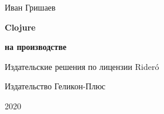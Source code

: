 
\begin{titlepage}

\begin{center}

  {Иван Гришаев}

  \vspace*{5cm}

  {\Huge\textbf{Clojure}}

  \vspace{1mm}

  {\Large\textbf{на производстве}}

  \vspace*{\fill}

  \ifx\publisher\ridero
  {Издательские решения по лицензии Rider\'{o}}
  \fi

  \ifx\publisher\helicon
  {Издательство Геликон-Плюс}
  \fi

  {2020}

\end{center}

\end{titlepage}
